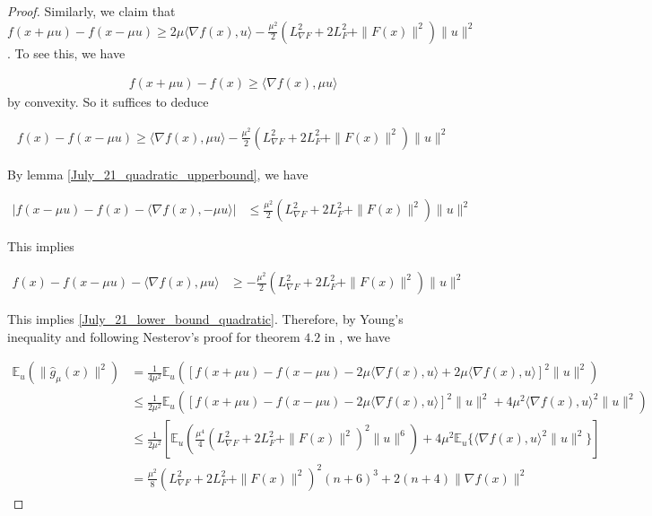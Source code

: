 \documentclass{article}
\begin{document}
\begin{theorem}
\begin{proof}
Similarly, we claim that $f(x+\mu u) - f(x-\mu u) \geq 2\mu\langle \nabla f(x),u\rangle - \frac{\mu^2}{2}(L_{\nabla F}^2 + 2L_F^2 + \|F(x)\|^2)\|u\|^2$. To see this, we have 

\begin{align*}
f(x+ \mu u) - f(x) \geq \langle \nabla f(x), \mu u\rangle
\end{align*}
by convexity. So it suffices to deduce 

\begin{align}
f(x)-f(x-\mu u) \geq \langle \nabla f(x),\mu u\rangle - \frac{\mu^2}{2}(L_{\nabla F}^2 + 2L_F^2 + \|F(x)\|^2)\|u\|^2 \label{July_21_lower_bound_quadratic}
\end{align}

By lemma \ref{July_21_quadratic_upperbound}, we have 

\begin{align*}
|f(x-\mu u) - f(x) - \langle \nabla f(x), -\mu u \rangle | & \leq \frac{\mu^2}{2}(L_{\nabla F}^2 + 2L_F^2 + \|F(x)\|^2)\|u\|^2
\end{align*}

This implies 

\begin{align*}
f(x) - f(x-\mu u) - \langle \nabla f(x),\mu u\rangle  & \geq -\frac{\mu^2}{2}(L_{\nabla F}^2 + 2L_F^2 + \|F(x)\|^2)\|u\|^2
\end{align*}

This implies \eqref{July_21_lower_bound_quadratic}. Therefore, by Young's inequality and following Nesterov's proof for theorem $4.2$ in \cite{Nesterov2015}, we have

\begin{align*}
\mathbb{E}_u(\| \hat{g}_{\mu}(x) \|^2) & =  \frac{1}{4\mu^2}\mathbb{E}_u([ f(x+\mu u) - f(x-\mu u) - 2\mu\langle \nabla f(x),u\rangle + 2\mu \langle \nabla f(x),u\rangle ]^2\|u\|^2) \\ & \leq \frac{1}{2\mu^2}\mathbb{E}_u([f(x+\mu u) - f(x-\mu u) - 2\mu\langle \nabla f(x),u\rangle]^2\|u\|^2 + 4\mu^2\langle \nabla f(x),u\rangle^2\|u\|^2) \\ & \leq \frac{1}{2\mu^2}\left[\mathbb{E}_u(\frac{\mu^4}{4}(L_{\nabla F}^2 + 2L_F^2 + \|F(x)\|^2)^2\|u\|^6) + 4\mu^2 \mathbb{E}_u\{\langle \nabla f(x),u\rangle^2 \|u\|^2\}\right] \\ & = \frac{\mu^2}{8}(L_{\nabla F}^2 + 2L_F^2 + \|F(x)\|^2)^2(n+6)^3 + 2(n+4)\|\nabla f(x)\|^2
\end{align*}

\end{proof}
\end{theorem}
\end{document}
